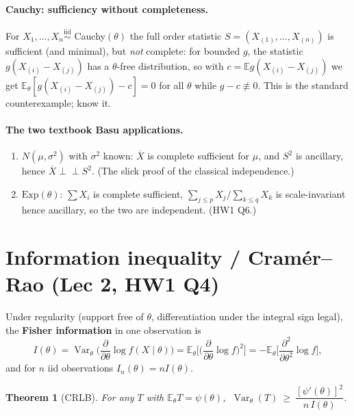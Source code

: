\documentclass[11pt]{article}
\newtheorem{theorem}{Theorem}[section]
\theoremstyle{remark}
\newcommand{\E}{\mathbb{E}}
\newcommand{\Var}{\operatorname{Var}}
\newcommand{\Xbar}{\overline{X}}
\newcommand{\iid}{\overset{\text{iid}}{\sim}}
\newcommand{\ind}{\perp\!\!\!\perp}
\begin{document}
\paragraph{Cauchy: sufficiency without completeness.} For $X_1,\dots,X_n\iid$
Cauchy$(\theta)$ the full order statistic $S=(X_{(1)},\dots,X_{(n)})$ is sufficient (and
minimal), but \emph{not} complete: for bounded $g$, the statistic $g(X_{(i)}-X_{(j)})$ has a
$\theta$-free distribution, so with $c=\E g(X_{(i)}-X_{(j)})$ we get
$\E_\theta[g(X_{(i)}-X_{(j)})-c]=0$ for all $\theta$ while $g-c\not\equiv0$. This is the
standard counterexample; know it.

\paragraph{The two textbook Basu applications.}
\begin{enumerate}[label=(\roman*)]
\item $N(\mu,\sigma^2)$ with $\sigma^2$ known: $\Xbar$ is complete sufficient for $\mu$, and
$S^2$ is ancillary, hence $\Xbar\ind S^2$. (The slick proof of the classical independence.)
\item $\mathrm{Exp}(\theta)$: $\sum X_i$ is complete sufficient, $\sum_{j\le p}X_j/\sum_{k\le q}X_k$
is scale-invariant hence ancillary, so the two are independent. (HW1 Q6.)
\end{enumerate}

\section{Information inequality / Cram\'er--Rao (Lec 2, HW1 Q4)}

Under regularity (support free of $\theta$, differentiation under the integral sign legal), the
\textbf{Fisher information} in one observation is
\[
I(\theta)=\Var_\theta\!\Big(\frac{\partial}{\partial\theta}\log f(X\mid\theta)\Big)
=\E_\theta\!\Big[\Big(\frac{\partial}{\partial\theta}\log f\Big)^{\!2}\Big]
=-\E_\theta\Big[\frac{\partial^2}{\partial\theta^2}\log f\Big],
\]
and for $n$ iid observations $I_n(\theta)=nI(\theta)$.

\begin{theorem}[CRLB]
For any $T$ with $\E_\theta T=\psi(\theta)$,
$\ \Var_\theta(T)\ \ge\ \dfrac{[\psi'(\theta)]^2}{n\,I(\theta)}$.
\end{theorem}
\end{document}
